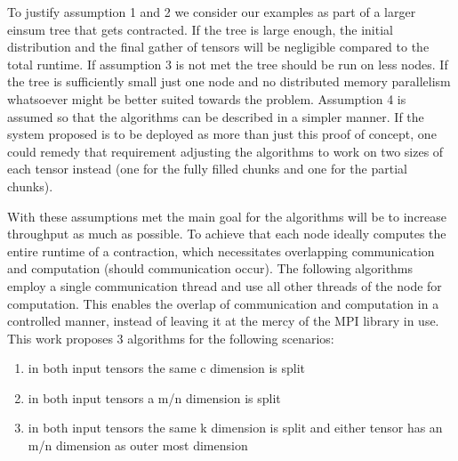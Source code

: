 To justify assumption 1 and 2 we consider our examples as part of a larger einsum tree that gets contracted.
If the tree is large enough, the initial distribution and the final gather of tensors will be negligible compared to the total runtime. %
If assumption 3 is not met the tree should be run on less nodes. %
If the tree is sufficiently small just one node and no distributed memory parallelism whatsoever might be better suited towards the problem.
Assumption 4 is assumed so that the algorithms can be described in a simpler manner.
If the system proposed is to be deployed as more than just this proof of concept, one could remedy that requirement adjusting the algorithms to work on two sizes of each tensor instead (one for the fully filled chunks and one for the partial chunks). %

With these assumptions met the main goal for the algorithms will be to increase throughput as much as possible.
To achieve that each node ideally computes the entire runtime of a contraction, which necessitates overlapping communication and computation (should communication occur).
The following algorithms employ a single communication thread and use all other threads of the node for computation.
This enables the overlap of communication and computation in a controlled manner, instead of leaving it at the mercy of the MPI library in use. %
This work proposes 3 algorithms for the following scenarios:
\begin{enumerate}
    \item in both input tensors the same c dimension is split
    \item in both input tensors a m/n dimension is split %
    \item in both input tensors the same k dimension is split and either tensor has an m/n dimension as outer most dimension
\end{enumerate}

